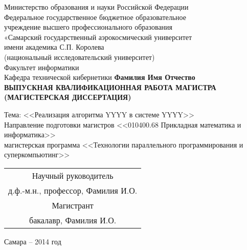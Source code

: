 \thispagestyle{empty}

\begin{center}{\normalsize
Министерство образования и науки Российской Федерации\\
Федеральное государственное бюджетное образовательное\\
учреждение высшего профессионального образования\\
 «Самарский государственный аэрокосмический университет\\
 имени академика С.П. Королева\\
 (национальный исследовательский университет)\\[10pt]
Факультет информатики \\
Кафедра технической кибернетики}
\vfill
{\large\bfseries Фамилия Имя Отчество}\\[10pt]
{\bfseries ВЫПУСКНАЯ КВАЛИФИКАЦИОННАЯ РАБОТА МАГИСТРА\\ (МАГИСТЕРСКАЯ ДИССЕРТАЦИЯ)}\\[10pt]
\end{center}
\normalsize 
\nohyphens{Тема: <<Реализация алгоритма YYYY в системе YYYY>>}\\[20pt]
\vfill
{\noindent\nohyphens{Направление подготовки магистров <<010400.68 Прикладная математика и информатика>> \\
магистерская программа <<Технологии параллельного программирования и суперкомпьютинг>>}}
\vfill
~\hfill 
{\normalsize
    \begin{tabular}{c}
     Научный руководитель\\
     д.ф.-м.н., профессор, Фамилия И.О.\\[20pt]
            Магистрант\\
     бакалавр, Фамилия И.О.
    \end{tabular}
}
\vfill

\begin{center}
\large Самара -- 2014 год
\end{center}

\clearpage
